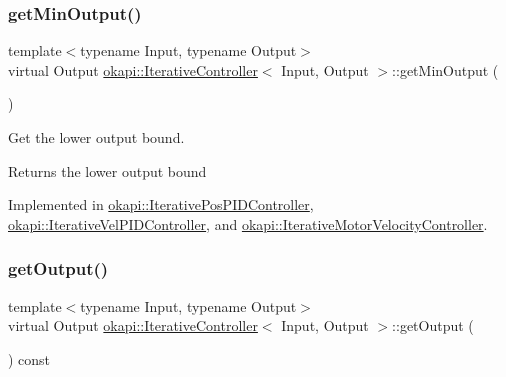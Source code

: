 \mbox{\label{classokapi_1_1IterativeController_a4d271df97caeedbcc807b714a48eaa30}} 
\subsubsection{\texorpdfstring{getMinOutput()}{getMinOutput()}}
{\footnotesize\ttfamily template$<$typename Input, typename Output$>$ \\
virtual Output \mbox{\hyperlink{classokapi_1_1IterativeController}{okapi\+::\+Iterative\+Controller}}$<$ Input, Output $>$\+::get\+Min\+Output (\begin{DoxyParamCaption}{ }\end{DoxyParamCaption})\hspace{0.3cm}{\ttfamily [pure virtual]}}

Get the lower output bound.

\begin{DoxyReturn}{Returns}
the lower output bound 
\end{DoxyReturn}


Implemented in \mbox{\hyperlink{classokapi_1_1IterativePosPIDController_a51666c20236a2a9ff87e843cf746833e}{okapi\+::\+Iterative\+Pos\+P\+I\+D\+Controller}}, \mbox{\hyperlink{classokapi_1_1IterativeVelPIDController_a0401715743d991c5ca9f3afa51a5a069}{okapi\+::\+Iterative\+Vel\+P\+I\+D\+Controller}}, and \mbox{\hyperlink{classokapi_1_1IterativeMotorVelocityController_a32942ed7359481ede1fba86d7dc44795}{okapi\+::\+Iterative\+Motor\+Velocity\+Controller}}.

\mbox{\label{classokapi_1_1IterativeController_a83e0aac640804974f0e06936b9f7898a}} 
\subsubsection{\texorpdfstring{getOutput()}{getOutput()}}
{\footnotesize\ttfamily template$<$typename Input, typename Output$>$ \\
virtual Output \mbox{\hyperlink{classokapi_1_1IterativeController}{okapi\+::\+Iterative\+Controller}}$<$ Input, Output $>$\+::get\+Output (\begin{DoxyParamCaption}{ }\end{DoxyParamCaption}) const\hspace{0.3cm}{\ttfamily [pure virtual]}}

